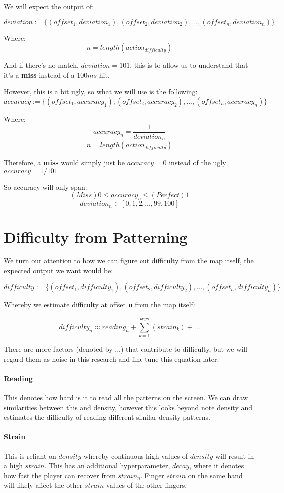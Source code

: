 \documentclass{article}
\begin{document}
We will expect the output of:

$$ deviation := \lbrace(offset_1, deviation_1), (offset_2, deviation_2), ..., (offset_n, deviation_n)\rbrace $$

Where:
$$ n = length(action_{difficulty}) $$

And if there's no match, $deviation = 101$, this is to allow us to understand that it's a \textbf{miss} instead of a $100ms$ hit.

However, this is a bit ugly, so what we will use is the following:
$$ accuracy := \lbrace(offset_1, accuracy_1), (offset_2, accuracy_2), ..., (offset_n, accuracy_n)\rbrace $$

Where:
$$ accuracy_n = \frac{1}{deviation_n} $$
$$ n = length(action_{difficulty}) $$

Therefore, a \textbf{miss} would simply just be $accuracy = 0$ instead of the ugly $accuracy = 1/101$

So accuracy will only span:
$$ (Miss) 0 \leq accuracy_n \leq (Perfect) 1 $$
$$ deviation_n \in [0, 1, 2, ..., 99, 100] $$

\section{Difficulty from Patterning}

We turn our attention to how we can figure out difficulty from the map itself, the expected output we want would be:

$$ difficulty := \lbrace(offset_1, difficulty_1), (offset_2, difficulty_2), ..., (offset_n, difficulty_n)\rbrace $$

Whereby we estimate difficulty at offset \textbf{n} from the map itself:

$$ difficulty_n \approx reading_n + \sum_{k=1}^{keys} \left(strain_k \right) + ... $$

There are more factors (denoted by $...$) that contribute to difficulty, but we will regard them as noise in this research and fine tune this equation later.

\paragraph{Reading} This denotes how hard is it to read all the patterns on the screen. We can draw similarities between this and density, however this looks beyond note density and estimates the difficulty of reading different similar density patterns.

\paragraph{Strain} This is reliant on $density$ whereby continuous high values of $ density$ will result in a high $strain$. This has an additional hyperparameter, $decay$, where it denotes how fast the player can recover from $strain_n$. Finger $strain$ on the same hand will likely affect the other $strain$ values of the other fingers.
\end{document}
